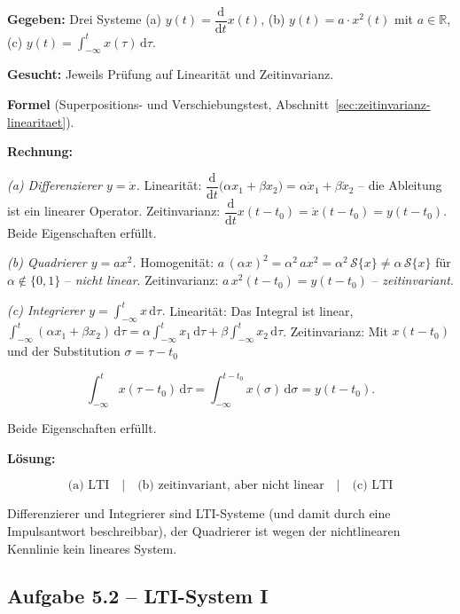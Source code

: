 \begin{beispiel}

\textbf{Gegeben:} Drei Systeme
(a) $y(t) = \dfrac{\mathrm{d}}{\mathrm{d}t} x(t)$, \quad
(b) $y(t) = a\cdot x^2(t)$ mit $a \in \mathbb{R}$, \quad
(c) $y(t) = \displaystyle\int_{-\infty}^{t} x(\tau)\,\mathrm{d}\tau$.

\textbf{Gesucht:} Jeweils Prüfung auf Linearität und Zeitinvarianz.

\textbf{Formel} (Superpositions- und Verschiebungstest,
Abschnitt~\ref{sec:zeitinvarianz-linearitaet}).

\textbf{Rechnung:}

\emph{(a) Differenzierer $y = \dot{x}$.}
Linearität: $\dfrac{\mathrm{d}}{\mathrm{d}t}\big(\alpha x_1 + \beta x_2\big)
= \alpha \dot{x}_1 + \beta \dot{x}_2$ -- die Ableitung ist ein linearer Operator.
Zeitinvarianz: $\dfrac{\mathrm{d}}{\mathrm{d}t} x(t - t_0) = \dot{x}(t - t_0)
= y(t - t_0)$. Beide Eigenschaften erfüllt.

\emph{(b) Quadrierer $y = a x^2$.}
Homogenität: $a\,(\alpha x)^2 = \alpha^2\, a x^2 = \alpha^2\,\mathcal{S}\{x\}
\neq \alpha\,\mathcal{S}\{x\}$ für $\alpha \notin \{0,1\}$ -- \emph{nicht linear}.
Zeitinvarianz: $a\, x^2(t - t_0) = y(t - t_0)$ -- \emph{zeitinvariant}.

\emph{(c) Integrierer $y = \int_{-\infty}^{t} x\,\mathrm{d}\tau$.}
Linearität: Das Integral ist linear,
$\int_{-\infty}^{t}(\alpha x_1 + \beta x_2)\,\mathrm{d}\tau
= \alpha\int_{-\infty}^{t} x_1\,\mathrm{d}\tau + \beta\int_{-\infty}^{t} x_2\,\mathrm{d}\tau$.
Zeitinvarianz: Mit $x(t - t_0)$ und der Substitution $\sigma = \tau - t_0$

$$
\int_{-\infty}^{t} x(\tau - t_0)\,\mathrm{d}\tau
= \int_{-\infty}^{t - t_0} x(\sigma)\,\mathrm{d}\sigma = y(t - t_0).
$$

Beide Eigenschaften erfüllt.

\textbf{Lösung:}

$$
\boxed{\;
\text{(a) LTI} \quad\big|\quad
\text{(b) zeitinvariant, aber nicht linear} \quad\big|\quad
\text{(c) LTI}
\;}
$$

Differenzierer und Integrierer sind LTI-Systeme (und damit durch eine
Impulsantwort beschreibbar), der Quadrierer ist wegen der nichtlinearen
Kennlinie kein lineares System.

\end{beispiel}

\subsection*{Aufgabe 5.2 – LTI-System I}

